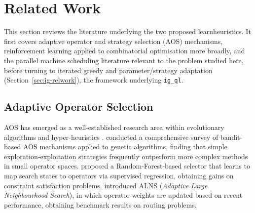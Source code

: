 \documentclass[final,3p,times,11pt,authoryear]{elsarticle}
\begin{document}
\section{Related Work}
\label{sec:related}

This section reviews the literature underlying the two proposed
learnheuristics. It first covers adaptive operator and strategy
selection (AOS) mechanisms, reinforcement learning applied to
combinatorial optimisation more broadly, and the parallel machine
scheduling literature relevant to the problem studied here, before
turning to iterated greedy and parameter/strategy adaptation
(Section~\ref{sec:ig-relwork}), the framework underlying
\texttt{ig\_ql}.

\subsection{Adaptive Operator Selection}

AOS has emerged as a well-established research area within
evolutionary algorithms and hyper-heuristics \citep{BurkeEtal2013}.
\citet{FialhoEtal2010} conducted a comprehensive survey of bandit-based
AOS mechanisms applied to genetic algorithms, finding that simple
exploration-exploitation strategies frequently outperform more complex
methods in small operator spaces.
\citet{MaturanaSaubion2008} proposed a Random-Forest-based selector
that learns to map search states to operators via supervised
regression, obtaining gains on constraint satisfaction problems.
\citet{PisingerRopke2007} introduced ALNS (\textit{Adaptive Large
Neighbourhood Search}), in which operator weights are updated based on
recent performance, obtaining benchmark results on routing problems.
\end{document}
